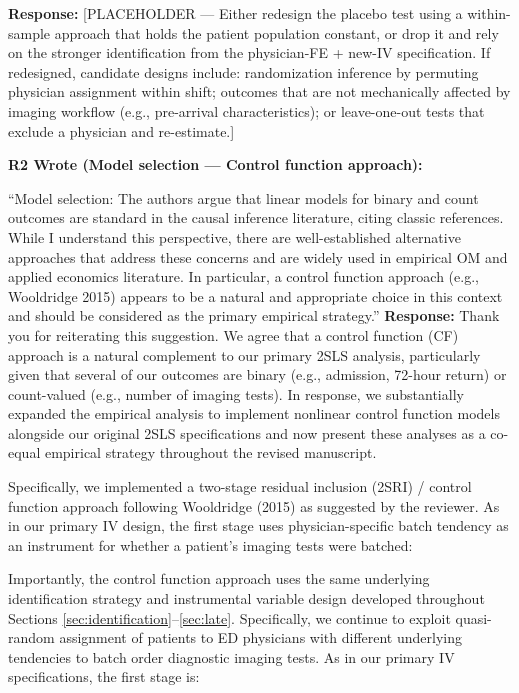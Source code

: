 \documentclass[11pt]{article}
\newenvironment{quote2}
{ \bigskip
\noindent
         \small\em
         \baselineskip=14pt
}
\newcommand{\1}{\hbox{\rm 1\kern-.35em 1}}
\begin{document}
\noindent\textbf{Response:} \color{blue}[PLACEHOLDER --- Either redesign the placebo test using a within-sample approach that holds the patient population constant, or drop it and rely on the stronger identification from the physician-FE + new-IV specification. If redesigned, candidate designs include: randomization inference by permuting physician assignment within shift; outcomes that are not mechanically affected by imaging workflow (e.g., pre-arrival characteristics); or leave-one-out tests that exclude a physician and re-estimate.]
\color{black}

\begin{quote2}
\textbf{R2 Wrote (Model selection --- Control function approach):}

\noindent ``Model selection: The authors argue that linear models for binary and count outcomes are standard in the causal inference literature, citing classic references. While I understand this perspective, there are well-established alternative approaches that address these concerns and are widely used in empirical OM and applied economics literature. In particular, a control function approach (e.g., Wooldridge 2015) appears to be a natural and appropriate choice in this context and should be considered as the primary empirical strategy.''
\end{quote2}

\noindent\textbf{Response:} \color{blue}Thank you for reiterating this suggestion. We agree that a control function (CF) approach is a natural complement to our primary 2SLS analysis, particularly given that several of our outcomes are binary (e.g., admission, 72-hour return) or count-valued (e.g., number of imaging tests). In response, we substantially expanded the empirical analysis to implement nonlinear control function models alongside our original 2SLS specifications and now present these analyses as a co-equal empirical strategy throughout the revised manuscript.

Specifically, we implemented a two-stage residual inclusion (2SRI) / control function approach following Wooldridge (2015) as suggested by the reviewer. As in our primary IV design, the first stage uses physician-specific batch tendency as an instrument for whether a patient’s imaging tests were batched:

Importantly, the control function approach uses the same underlying identification strategy and instrumental variable design developed throughout Sections \ref{sec:identification}--\ref{sec:late}. Specifically, we continue to exploit quasi-random assignment of patients to ED physicians with different underlying tendencies to batch order diagnostic imaging tests. As in our primary IV specifications, the first stage is:
\end{document}
